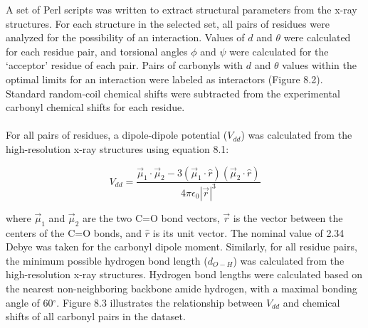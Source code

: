 \begin{doublespace}
A set of Perl scripts was written to extract structural parameters from
the x-ray structures. For each structure in the selected set, all pairs of
residues were analyzed for the possibility of an \npistar{} interaction. Values
of $d$ and $\theta$ were calculated for each residue pair, and torsional angles
$\phi$ and $\psi$ were calculated for the `acceptor' residue of each pair.
Pairs of carbonyls with $d$ and $\theta$ values within the optimal limits for
an \npistar{} interaction were labeled as interactors (Figure 8.2). Standard
random-coil chemical shifts were subtracted from the experimental carbonyl
\cnmr{} chemical shifts for each residue.
\\\\
For all pairs of residues, a dipole-dipole potential ($V_{dd}$) was calculated
from the high-resolution x-ray structures using equation 8.1:

\begin{equation}
V_{dd} = \frac{
  \vec{\mu}_1 \cdot \vec{\mu}_2 - 3 
    (\vec{\mu}_1 \cdot \hat{r})
    (\vec{\mu}_2 \cdot \hat{r})}{
  4 \pi \epsilon_0 |\vec{r}|^3}
\end{equation}

where $\vec{\mu}_1$ and $\vec{\mu}_2$ are the two C=O bond vectors, $\vec{r}$
is the vector between the centers of the C=O bonds, and $\hat{r}$ is its unit
vector. The nominal value of 2.34 Debye was taken for the carbonyl dipole
moment. Similarly, for all residue pairs, the minimum possible hydrogen bond
length ($d_{O-H}$) was calculated from the high-resolution x-ray structures.
Hydrogen bond lengths were calculated based on the nearest non-neighboring
backbone amide hydrogen, with a maximal bonding angle of 60$^\circ$. Figure
8.3 illustrates the relationship between $V_{dd}$ and \cnmr{} chemical shifts
of all carbonyl pairs in the dataset.
\end{doublespace}


